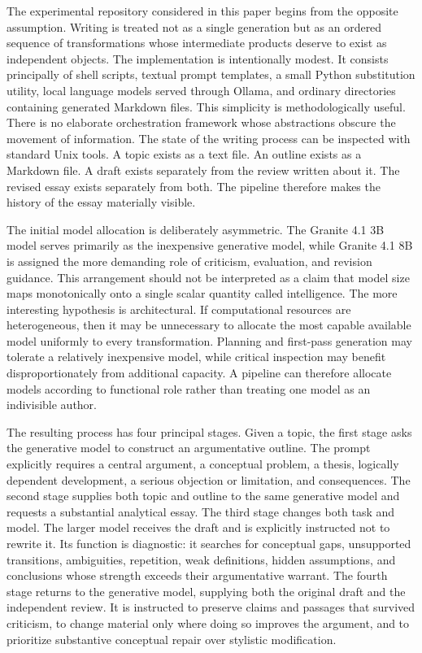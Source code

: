 \documentclass[11pt]{article}
\begin{document}
The experimental repository considered in this paper begins from the opposite assumption. Writing is treated not as a single generation but as an ordered sequence of transformations whose intermediate products deserve to exist as independent objects. The implementation is intentionally modest. It consists principally of shell scripts, textual prompt templates, a small Python substitution utility, local language models served through Ollama, and ordinary directories containing generated Markdown files. This simplicity is methodologically useful. There is no elaborate orchestration framework whose abstractions obscure the movement of information. The state of the writing process can be inspected with standard Unix tools. A topic exists as a text file. An outline exists as a Markdown file. A draft exists separately from the review written about it. The revised essay exists separately from both. The pipeline therefore makes the history of the essay materially visible.

The initial model allocation is deliberately asymmetric. The Granite 4.1 3B model serves primarily as the inexpensive generative model, while Granite 4.1 8B is assigned the more demanding role of criticism, evaluation, and revision guidance. This arrangement should not be interpreted as a claim that model size maps monotonically onto a single scalar quantity called intelligence. The more interesting hypothesis is architectural. If computational resources are heterogeneous, then it may be unnecessary to allocate the most capable available model uniformly to every transformation. Planning and first-pass generation may tolerate a relatively inexpensive model, while critical inspection may benefit disproportionately from additional capacity. A pipeline can therefore allocate models according to functional role rather than treating one model as an indivisible author.

The resulting process has four principal stages. Given a topic, the first stage asks the generative model to construct an argumentative outline. The prompt explicitly requires a central argument, a conceptual problem, a thesis, logically dependent development, a serious objection or limitation, and consequences. The second stage supplies both topic and outline to the same generative model and requests a substantial analytical essay. The third stage changes both task and model. The larger model receives the draft and is explicitly instructed not to rewrite it. Its function is diagnostic: it searches for conceptual gaps, unsupported transitions, ambiguities, repetition, weak definitions, hidden assumptions, and conclusions whose strength exceeds their argumentative warrant. The fourth stage returns to the generative model, supplying both the original draft and the independent review. It is instructed to preserve claims and passages that survived criticism, to change material only where doing so improves the argument, and to prioritize substantive conceptual repair over stylistic modification.
\end{document}
